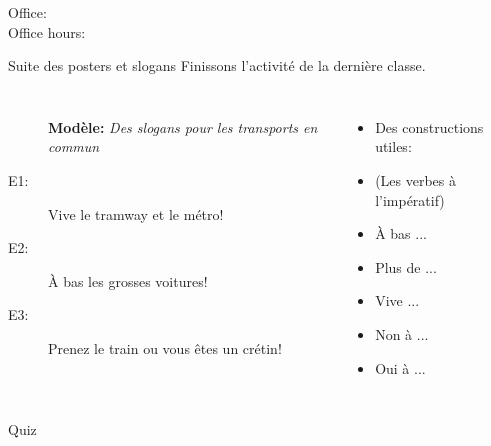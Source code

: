 \documentclass{beamer}
\subtitle[Subjonctif c. indicatif]{Le subjonctif contre l'indicatif}
\begin{document}
  \begin{frame}
    \titlepage
    \tiny{Office: \\
          Office hours: }
  \end{frame}

  \begin{frame}{Suite des posters et slogans}
    Finissons l'activité de la dernière classe.
    \begin{columns}[t]
        \begin{description}
          \item[] \textbf{Modèle:} \emph{Des slogans pour les transports en commun}
          \item[E1:] Vive le tramway et le métro!
          \item[E2:] À bas les grosses voitures!
          \item[E3:] Prenez le train ou vous êtes un crétin!
        \end{description}
        \begin{itemize}
          \item[] Des constructions utiles:
          \item (Les verbes à l'impératif)
          \item À bas ... 
          \item Plus de ... 
          \item Vive ...
          \item Non à ...
          \item Oui à ...
        \end{itemize}
    \end{columns}
  \end{frame}

  \begin{frame}{}
    \begin{center}
      \Large Quiz
    \end{center}
  \end{frame}
\end{document}
